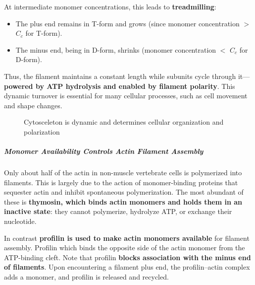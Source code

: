 \documentclass[../main.tex]{subfiles}
\begin{document}
At intermediate monomer concentrations, this leads to \textbf{treadmilling}:
\begin{itemize}
	\item The plus end remains in T-form and grows (since monomer concentration $>$ $C_c$ for T-form).
	\item The minus end, being in D-form, shrinks (monomer concentration $<$ $C_c$ for D-form).
\end{itemize}
Thus, the filament maintains a constant length while subunits cycle through it—\textbf{powered by ATP hydrolysis and enabled by filament polarity}. This dynamic turnover is essential for many cellular processes, such as cell movement and shape changes.	
\begin{figure}[H]
	\centering
	\caption{Cytosceleton is dynamic and determines cellular organization and polarization}
\end{figure}

\subparagraph{Monomer Availability Controls Actin Filament Assembly}
Only about half of the actin in non-muscle vertebrate cells is polymerized into filaments. This is largely due to the action of monomer-binding proteins that sequester actin and inhibit spontaneous polymerization. The most abundant of these is \textbf{\gls{thymosin}, which binds actin monomers and holds them in an inactive state}: they cannot polymerize, hydrolyze ATP, or exchange their nucleotide.

In contrast \textbf{\gls{profilin} is used to make actin monomers available} for filament assembly. Profilin which binds the opposite side of the actin monomer from the ATP-binding cleft. Note that profilin \textbf{blocks association with the minus end of filaments}. Upon encountering a filament plus end, the profilin–actin complex adds a monomer, and profilin is released and recycled. 
\end{document}
